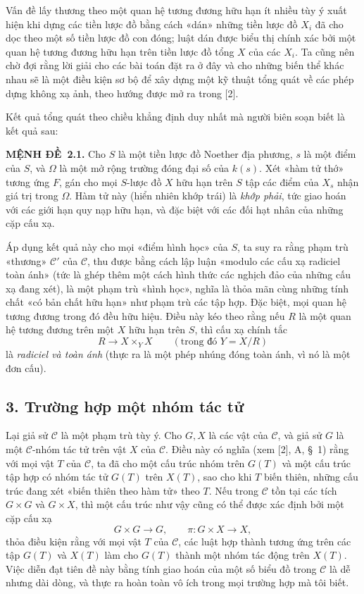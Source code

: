 \documentclass[11pt,twoside,openany]{book}
\numberwithin{equation}{section}
\newcommand{\src}[1]{%
  \phantomsection\hypertarget{src:\fgasourceid:#1}{}%
  \marginpar{\raggedleft\footnotesize\sffamily #1}%
}
\newcommand{\fgasourceid}{unset}
\newcommand{\result}[2]{\par\medskip\noindent\textbf{#1\if\relax\detokenize{#2}\relax\else\ #2\fi.}\quad}
\begin{document}
Vấn đề lấy thương theo một quan hệ tương đương hữu hạn ít nhiều tùy ý xuất
hiện khi dựng các tiền lược đồ bằng cách «dán» những tiền lược đồ $X_i$ đã cho
dọc theo một số tiền lược đồ con đóng; luật dán được biểu thị chính xác bởi
một quan hệ tương đương hữu hạn trên tiền lược đồ tổng $X$ của các $X_i$. Ta
cũng nên chờ đợi rằng lời giải cho các bài toán đặt ra ở đây và cho những biến
thể khác nhau sẽ là một điều kiện sơ bộ để xây dựng một kỹ thuật tổng quát về
các phép dựng không xạ ảnh, theo hướng được mở ra trong [2].

Kết quả tổng quát theo chiều khẳng định duy nhất mà người biên soạn biết là
kết quả sau:

\result{MỆNH ĐỀ}{2.1} Cho $S$ là một tiền lược đồ Noether địa phương, $s$ là
một điểm của $S$, và $\Omega$ là một mở rộng trường đóng đại số của $k(s)$.
Xét
\src{104}«hàm tử thớ» tương ứng $F$, gán cho mọi $S$-lược đồ $X$ hữu hạn
trên $S$ tập các điểm của $X_s$ nhận giá trị trong $\Omega$. Hàm tử này (hiển
nhiên khớp trái) là \emph{khớp phải}, tức giao hoán với các giới hạn quy nạp
hữu hạn, và đặc biệt với các đối hạt nhân của những cặp cấu xạ.

Áp dụng kết quả này cho mọi «điểm hình học» của $S$, ta suy ra rằng phạm trù
«thương» $\mathcal C'$ của $\mathcal C$, thu được bằng cách lập luận «modulo
các cấu xạ radiciel toàn ánh» (tức là ghép thêm một cách hình thức các nghịch
đảo của những cấu xạ đang xét), là một phạm trù «hình học», nghĩa là thỏa mãn
cùng những tính chất «có bản chất hữu hạn» như phạm trù các tập hợp. Đặc biệt,
mọi quan hệ tương đương trong đó đều hữu hiệu. Điều này kéo theo rằng nếu $R$
là một quan hệ tương đương trên một $X$ hữu hạn trên $S$, thì cấu xạ chính tắc
\[
  R\longrightarrow X\times_Y X\qquad (\text{trong đó }Y=X/R)
\]
là \emph{radiciel và toàn ánh} (thực ra là một phép nhúng đóng toàn ánh, vì nó
là một đơn cấu).

\subsection*{3. Trường hợp một nhóm tác tử}

Lại giả sử $\mathcal C$ là một phạm trù tùy ý. Cho $G,X$ là các vật của
$\mathcal C$, và giả sử $G$ là một $\mathcal C$-nhóm tác tử trên vật $X$ của
$\mathcal C$. Điều này có nghĩa (xem [2], A, \S~1) rằng với mọi vật $T$ của
$\mathcal C$, ta đã cho một cấu trúc nhóm trên $G(T)$ và một cấu trúc tập hợp
có nhóm tác tử $G(T)$ trên $X(T)$, sao cho khi $T$ biến thiên, những cấu trúc
đang xét «biến thiên theo hàm tử» theo $T$. Nếu trong $\mathcal C$ tồn tại các
tích $G\times G$ và $G\times X$, thì một cấu trúc như vậy cũng có thể được
xác định bởi một cặp cấu xạ
\[
  G\times G\longrightarrow G,
  \qquad \pi:G\times X\longrightarrow X,
\]
thỏa điều kiện rằng với mọi vật $T$ của $\mathcal C$, các luật hợp thành tương
ứng trên các tập $G(T)$ và $X(T)$ làm cho $G(T)$ thành một nhóm tác động trên
$X(T)$. Việc diễn đạt tiên đề này bằng tính giao hoán của một số biểu đồ trong
$\mathcal C$ là dễ nhưng dài dòng, và thực ra hoàn toàn vô ích trong mọi
trường hợp mà tôi biết.
\end{document}
